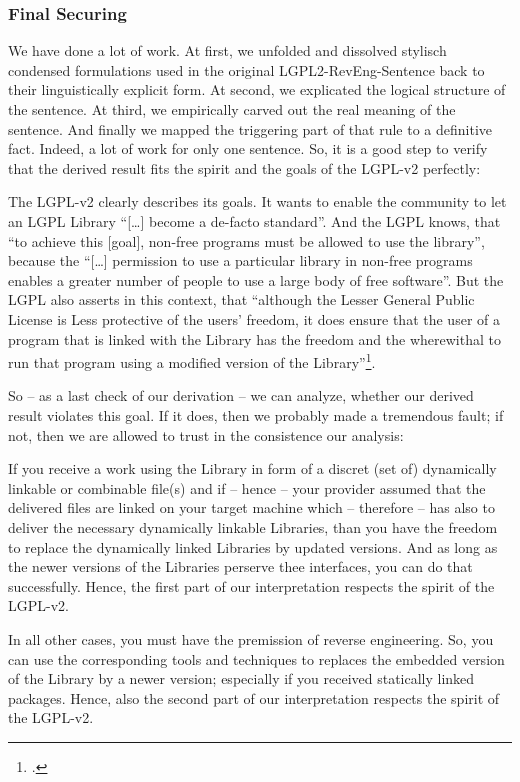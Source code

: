 \subsubsection{Final Securing}

We have done a lot of work. At first, we unfolded and dissolved stylisch
condensed formulations used in the original LGPL2-RevEng-Sentence back to their
linguistically explicit form. At second, we explicated the logical structure of
the sentence. At third, we empirically carved out the real meaning of the
sentence. And finally we mapped the triggering part of that rule to a definitive
fact. Indeed, a lot of work for only one sentence. So, it is a good step to
verify that the derived result fits the spirit and the goals of the LGPL-v2
perfectly:

The LGPL-v2 clearly describes its goals. It wants to enable the community to let
an LGPL Library \enquote{[\ldots] become a de-facto standard}. And the LGPL
knows, that \enquote{to achieve this [goal], non-free programs must be allowed
to use the library}, because the \enquote{[\ldots] permission to use a particular
library in non-free programs enables a greater number of people to use a large
body of free software}. But the LGPL also asserts in this context, that
\enquote{although the Lesser General Public License is Less protective of the
users' freedom, it does ensure that the user of a program that is linked with
the Library has the freedom and the wherewithal to run that program using a
modified version of the Library}\footcite[cf.][\nopage wp., preamble, emphasis
KR.]{Lgpl21OsiLicense1999a}.

So -- as a last check of our derivation -- we can analyze, whether our derived
result violates this goal. If it does, then we probably made a tremendous fault;
if not, then we are allowed to trust in the consistence our analysis:

If you receive a work using the Library in form of a discret (set of)
dynamically linkable or combinable file(s) and if -- hence -- your provider
assumed that the delivered files are linked on your target machine which --
therefore -- has also to deliver the necessary dynamically linkable Libraries,
than you have the freedom to replace the dynamically linked Libraries by updated
versions. And as long as the newer versions of the Libraries perserve thee
interfaces, you can do that successfully. Hence, the first part of our
interpretation respects the spirit of the LGPL-v2.

In all other cases, you must have the premission of reverse engineering. So, you
can use the corresponding tools and techniques to replaces the embedded version 
of the Library by a newer version; especially if you received statically linked
packages. Hence, also the second part of our interpretation respects the spirit
of the LGPL-v2.

